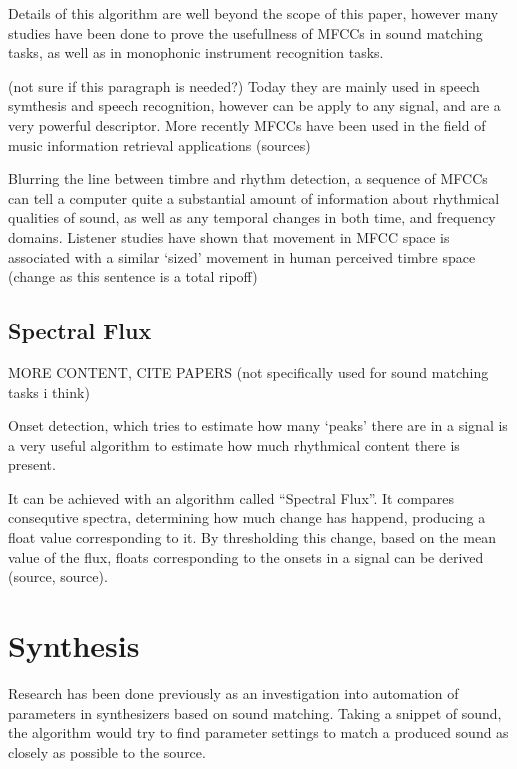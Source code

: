 Details of this algorithm are well beyond the scope of this paper,
however many studies have been done to prove the usefullness of MFCCs
in sound matching
tasks\cite{yee-king_synthbot:_nodate}\cite{heise_automated_2009}, as
well as in monophonic instrument recognition
tasks\cite{eronen_comparison_2001}.

(not sure if this paragraph is needed?)
Today they are mainly used in speech symthesis and speech recognition,
however can be apply to any signal, and are a very powerful
descriptor. More recently MFCCs have been used in the field of music
information retrieval applications (sources)

Blurring the line between timbre and rhythm detection, a sequence of
MFCCs can tell a computer quite a substantial amount of information
about rhythmical qualities of sound, as well as any temporal changes
in both time, and frequency domains. Listener studies have shown that
movement in MFCC space is associated with a similar `sized' movement
in human perceived timbre space\cite{terasawa_center_2005} (change as this sentence is a total ripoff)

\subsection{Spectral Flux}
MORE CONTENT, CITE PAPERS (not specifically used for sound matching
tasks i think)

Onset detection, which tries to estimate how many `peaks' there are
in a signal is a very useful algorithm to estimate how much rhythmical
content there is present.

It can be achieved with an algorithm called ``Spectral Flux''. It
compares consequtive spectra, determining how much change has happend,
producing a float value corresponding to it. By thresholding this
change, based on the mean value of the flux, floats corresponding to
the onsets in a signal can be derived (source, source).

\section{Synthesis}

Research has been done previously as an investigation into automation
of parameters in synthesizers based on sound matching. Taking a
snippet of sound, the algorithm would try to find parameter settings
to match a produced sound as closely as possible to the
source\cite{yee-king_automatic_2018}.

